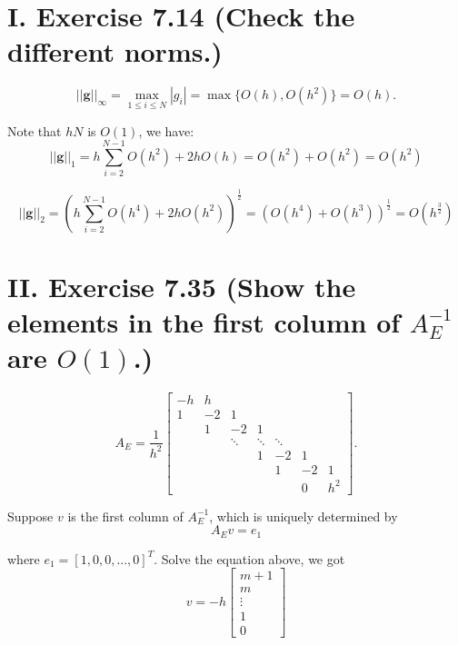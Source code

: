 \documentclass[twoside,a4paper]{article}
\begin{document}
\pagestyle{fancy}
\fancyhead{}


\section*{I. Exercise 7.14 (Check the different norms.)}

\begin{equation*}
	||\mathbf{g}||_\infty = \max_{1\leq i\leq N} |g_i| = \max\{O(h), O(h^2)\} = O(h).
\end{equation*}

Note that $hN$ is $O(1)$, we have:
\begin{equation*}
	||\mathbf{g}||_1=h\sum_{i=2}^{N-1} O(h^2) + 2hO(h) = O(h^2) + O(h^2) = O(h^2)
\end{equation*}

\begin{equation*}
	||\mathbf{g}||_2=\left(h\sum_{i=2}^{N-1} O(h^4) + 2hO(h^2)\right)^\frac{1}{2}=\left(O(h^4) + O(h^3)\right)^\frac{1}{2} = O\left(h^\frac{3}{2}\right)
\end{equation*}

\section*{II. Exercise 7.35 (Show the elements in the first column of $A_E^{-1}$ are $O(1)$.)}

\begin{equation*}
	A_E=\frac{1}{h^2}\begin{bmatrix}
		-h & h  &   & \\
		1  & -2 & 1 &  \\
		   & 1  & -2& 1  \\
		   &    & \ddots & \ddots & \ddots  \\
		   &    &        &  1 & -2 & 1 \\
		   &    &        &    &  1 & -2 & 1\\
		   &    &        &    &    &  0 & h^2
	\end{bmatrix}.
\end{equation*}

Suppose $v$ is the first column of $A_E^{-1}$, which is uniquely determined by
\begin{equation*}
	A_Ev=e_1
\end{equation*}

where $e_1=[1,0,0,...,0]^T$. Solve the equation above, we got
\begin{equation*}
	v=-h\begin{bmatrix}m+1 \\ m \\ \vdots \\ 1 \\ 0\end{bmatrix}
\end{equation*}
\end{document}

